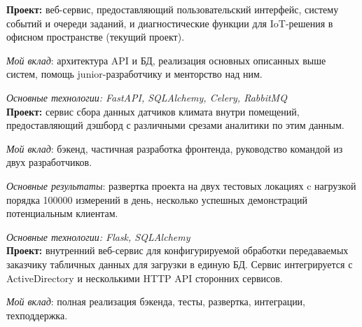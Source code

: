 \documentclass[
	a4paper,
]{fortysecondscv}
\begin{document}
\makefrontsidebar

\begin{cvtable}[3]
\end{cvtable}


\textbf{Проект:} веб-сервис, предоставляющий пользовательский интерфейс, систему событий и очереди заданий, и диагностические функции для IoT-решения в офисном пространстве (текущий проект).

\textit{Мой вклад}: архитектура API и БД, реализация основных описанных выше систем, помощь junior-разработчику и менторство над ним.

\textit{Основные технологии: FastAPI, SQLAlchemy, Celery, RabbitMQ}
\\[0.5em]
\textbf{Проект:} сервис сбора данных датчиков климата внутри помещений, предоставляющий дэшборд с различными срезами аналитики по этим данным.

\textit{Мой вклад}: бэкенд, частичная разработка фронтенда, руководство командой из двух разработчиков.

\textit{Основные результаты}: развертка проекта на двух тестовых локациях c нагрузкой порядка 100000 измерений в день, несколько успешных демонстраций потенциальным клиентам.

\textit{Основные технологии: Flask, SQLAlchemy}
\\[0.5em]
\textbf{Проект:} внутренний веб-сервис для конфигурируемой обработки передаваемых заказчику табличных данных для загрузки в единую БД. Сервис интегрируется с  \textenglish{ActiveDirectory} и несколькими \textenglish{HTTP API} сторонних сервисов.

\textit{Мой вклад}: полная реализация бэкенда, тесты, развертка, интеграции, техподдержка.
\end{document}
